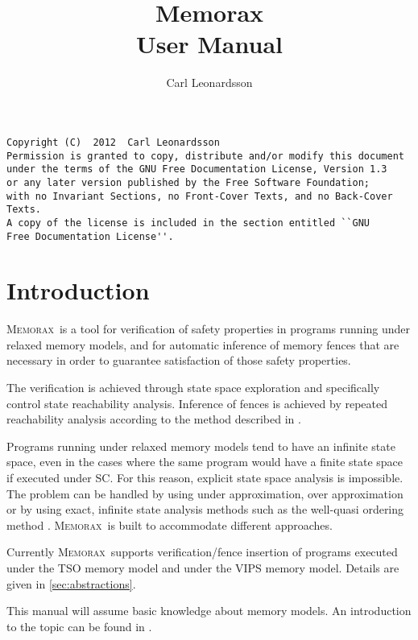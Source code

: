 \documentclass[a4paper]{article}
\title{Memorax\\\small{User Manual}}
\author{Carl Leonardsson}
\newcommand{\memorax}{\textsc{Memorax}}
\begin{document}
\maketitle

\pagebreak

\begin{Verbatim}[fontsize=\small]
Copyright (C)  2012  Carl Leonardsson
Permission is granted to copy, distribute and/or modify this document
under the terms of the GNU Free Documentation License, Version 1.3
or any later version published by the Free Software Foundation;
with no Invariant Sections, no Front-Cover Texts, and no Back-Cover Texts.
A copy of the license is included in the section entitled ``GNU
Free Documentation License''.
\end{Verbatim}

\pagebreak

\tableofcontents

\section{Introduction}

\memorax\ is a tool for verification of safety properties in programs
running under relaxed memory models, and for automatic inference of
memory fences that are necessary in order to guarantee satisfaction of
those safety properties.

The verification is achieved through state space exploration and
specifically control state reachability analysis. Inference of fences
is achieved by repeated reachability analysis according to the method
described in \cite{AACLR12}.

Programs running under relaxed memory models tend to have an infinite
state space, even in the cases where the same program would have a
finite state space if executed under SC. For this reason, explicit
state space analysis is impossible. The problem can be handled by
using under approximation, over approximation or by using exact,
infinite state analysis methods such as the well-quasi ordering
method \cite{ACJT96}. \memorax\ is built to accommodate different
approaches.

Currently \memorax\ supports verification/fence insertion of programs
executed under the TSO memory model and under the VIPS memory
model. Details are given in \cref{sec:abstractions}.

This manual will assume basic knowledge about memory models. An
introduction to the topic can be found in \cite{adve-gharachorloo-96}.
\end{document}
